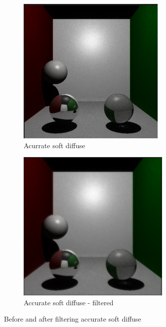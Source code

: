 \documentclass{article}
\begin{document}
\begin{figure}
\centering

\begin{subfigure}{.5\textwidth}
\centering
\includegraphics[width=0.85\linewidth]{accurate_sft_diff_RAW}
\caption{Acurrate soft diffuse}
\label{fig:sub1}
\end{subfigure}%
\begin{subfigure}{.5\textwidth}
\centering
\includegraphics[width=0.85\linewidth]{accurate_sft_diff_FLT}
\caption{Accurate soft diffuse - filtered}
\label{fig:sub2}
\end{subfigure}

\caption{Before and after filtering accurate soft diffuse}
\label{fig:AccuratefilterComp}
\end{figure}
\end{document}
